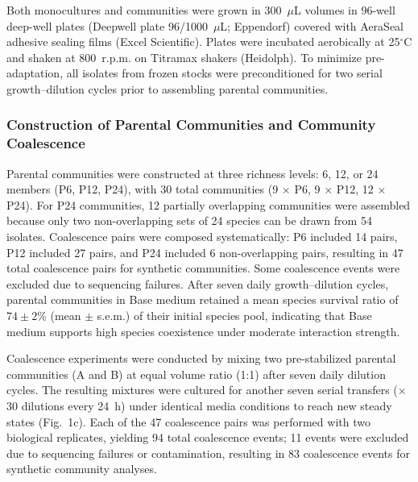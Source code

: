 Both monocultures and communities were grown in 300~$\mu$L volumes in 96-well deep-well plates (Deepwell plate 96/1000~$\mu$L; Eppendorf) covered with AeraSeal adhesive sealing films (Excel Scientific). Plates were incubated aerobically at 25$^\circ$C and shaken at 800~r.p.m. on Titramax shakers (Heidolph). To minimize pre-adaptation, all isolates from frozen stocks were preconditioned for two serial growth--dilution cycles prior to assembling parental communities.


\subsubsection*{Construction of Parental Communities and Community Coalescence}
\label{sec:suppl:coalescence}

Parental communities were constructed at three richness levels: 6, 12, or 24 members (P6, P12, P24), with 30 total communities (9 $\times$ P6, 9 $\times$ P12, 12 $\times$ P24). For P24 communities, 12 partially overlapping communities were assembled because only two non-overlapping sets of 24 species can be drawn from 54 isolates. Coalescence pairs were composed systematically: P6 included 14 pairs, P12 included 27 pairs, and P24 included 6 non-overlapping pairs, resulting in 47 total coalescence pairs for synthetic communities. Some coalescence events were excluded due to sequencing failures. After seven daily growth--dilution cycles, parental communities in Base medium retained a mean species survival ratio of $74 \pm 2$\% (mean $\pm$ s.e.m.) of their initial species pool, indicating that Base medium supports high species coexistence under moderate interaction strength.

Coalescence experiments were conducted by mixing two pre-stabilized parental communities (A and B) at equal volume ratio (1:1) after seven daily dilution cycles. The resulting mixtures were cultured for another seven serial transfers ($\times$30 dilutions every 24~h) under identical media conditions to reach new steady states (Fig.~1c). Each of the 47 coalescence pairs was performed with two biological replicates, yielding 94 total coalescence events; 11 events were excluded due to sequencing failures or contamination, resulting in 83 coalescence events for synthetic community analyses.


